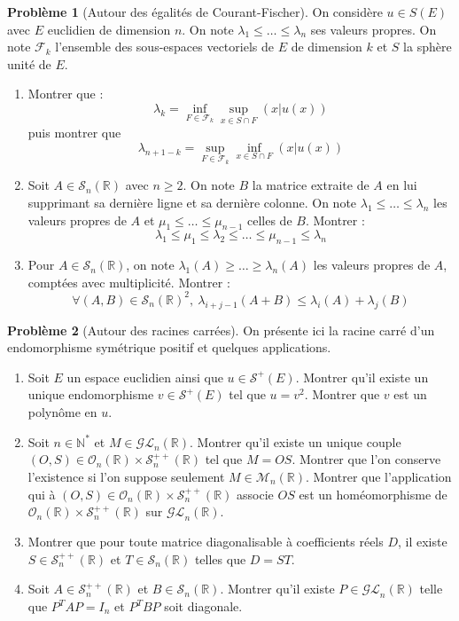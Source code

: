 \documentclass[french]{book}
\newcommand{\N}{\mathbb{N}}
\newcommand{\R}{\mathbb{R}}
\newcommand{\st}{^*}
\theoremstyle{definition}
\newtheorem{pro}{Problème}[chapter]
\theoremstyle{remark}
\begin{document}
\begin{pro}[Autour des égalités de Courant-Fischer]
	On considère $u\in S(E)$ avec $E$ euclidien de dimension $n$. On note $\lambda_1\leqslant\ldots\leqslant\lambda_n$ ses valeurs propres. On note $\mathcal{F}_k$ l'ensemble des sous-espaces vectoriels de $E$ de dimension $k$ et $S$ la sphère unité de $E$.
	\begin{enumerate}
		\item Montrer que : $$\lambda_k=\inf_{F\in\mathcal{F}_k}\sup_{x\in S\cap F}(x|u(x))$$ puis montrer que $$\lambda_{n+1-k}=\sup_{F\in\mathcal{F}_k}\inf_{x\in S\cap F}(x|u(x))$$
		\item Soit $A\in\mathcal{S}_n(\R)$ avec $n\geqslant 2$. On note $B$ la matrice extraite de $A$ en lui supprimant sa dernière ligne et sa dernière colonne. On note $\lambda_1\leqslant\ldots\leqslant\lambda_n$ les valeurs propres de $A$ et $\mu_1\leqslant\ldots\leqslant\mu_{n-1}$ celles de $B$. Montrer : $$\lambda_1\leqslant\mu_1\leqslant\lambda_2\leqslant\ldots\leqslant\mu_{n-1}\leqslant\lambda_n$$
		\item Pour $A\in\mathcal{S}_n(\R)$, on note $\lambda_1(A)\geqslant\ldots\geqslant\lambda_n(A)$ les valeurs propres de $A$, comptées avec multiplicité. Montrer : $$\forall (A,B)\in\mathcal{S}_n(\R)^2,\ \lambda_{i+j-1}(A+B)\leqslant\lambda_i(A)+\lambda_j(B)$$
	\end{enumerate}
\end{pro}

\begin{pro}[Autour des racines carrées]
	On présente ici la racine carré d'un endomorphisme symétrique positif et quelques applications.
	\begin{enumerate}
		\item Soit $E$ un espace euclidien ainsi que $u\in\mathcal{S}^+(E)$. Montrer qu'il existe un unique endomorphisme $v\in\mathcal{S}^+(E)$ tel que $u=v^2$. Montrer que $v$ est un polynôme en $u$.
		\item Soit $n\in\N\st$ et $M\in\mathcal{GL}_n(\R)$. Montrer qu'il existe un unique couple $(O,S)\in\mathcal{O}_n(\R)\times\mathcal{S}_n^{++}(\R)$ tel que $M=OS$. Montrer que l'on conserve l'existence si l'on suppose seulement $M\in\mathcal{M}_n(\R)$. Montrer que l'application qui à $(O,S)\in\mathcal{O}_n(\R)\times\mathcal{S}_n^{++}(\R)$ associe $OS$ est un homéomorphisme de $\mathcal{O}_n(\R)\times\mathcal{S}_n^{++}(\R)$ sur $\mathcal{GL}_n(\R)$.
		\item Montrer que pour toute matrice diagonalisable à coefficients réels $D$, il existe $S\in\mathcal{S}_n^{++}(\R)$ et $T\in\mathcal{S}_n(\R)$ telles que $D=ST$.
		\item Soit $A\in\mathcal{S}_n^{++}(\R)$ et $B\in\mathcal{S}_n(\R)$. Montrer qu'il existe $P\in\mathcal{GL}_n(\R)$ telle que $P^TAP=I_n$ et $P^TBP$ soit diagonale.
	\end{enumerate}
\end{pro}
\end{document}
